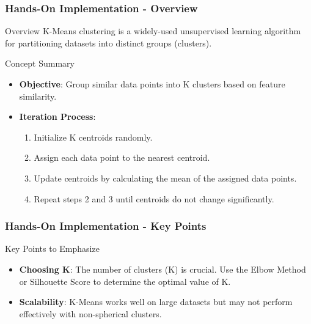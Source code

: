 \documentclass[aspectratio=169]{beamer}
\begin{document}
\begin{frame}[fragile]
    \frametitle{Hands-On Implementation - Overview}
    \begin{block}{Overview}
        K-Means clustering is a widely-used unsupervised learning algorithm for partitioning datasets into distinct groups (clusters).
    \end{block}
    \begin{block}{Concept Summary}
        \begin{itemize}
            \item \textbf{Objective}: Group similar data points into K clusters based on feature similarity.
            \item \textbf{Iteration Process}:
            \begin{enumerate}
                \item Initialize K centroids randomly.
                \item Assign each data point to the nearest centroid.
                \item Update centroids by calculating the mean of the assigned data points.
                \item Repeat steps 2 and 3 until centroids do not change significantly.
            \end{enumerate}
        \end{itemize}
    \end{block}
\end{frame}

\begin{frame}[fragile]
    \frametitle{Hands-On Implementation - Key Points}
    \begin{block}{Key Points to Emphasize}
        \begin{itemize}
            \item \textbf{Choosing K}: The number of clusters (K) is crucial. Use the Elbow Method or Silhouette Score to determine the optimal value of K.
            \item \textbf{Scalability}: K-Means works well on large datasets but may not perform effectively with non-spherical clusters.
        \end{itemize}
    \end{block}
\end{frame}
\end{document}

